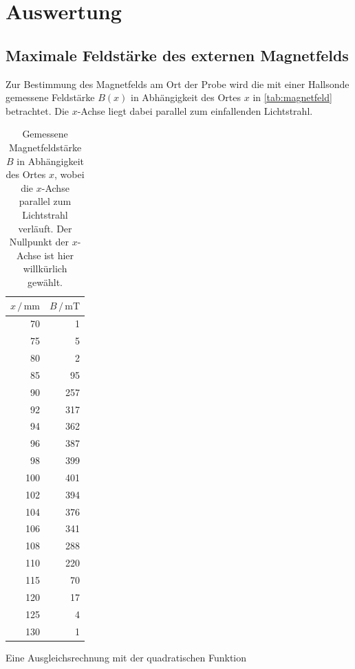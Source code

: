 \section{Auswertung}
\label{sec:Auswertung}

\subsection{Maximale Feldstärke des externen Magnetfelds}
\label{sec:magnetfeld}
Zur Bestimmung des Magnetfelds am Ort der Probe wird die mit einer Hallsonde gemessene Feldstärke $B(x)$ in Abhängigkeit des Ortes $x$ in \autoref{tab:magnetfeld} betrachtet.
Die $x$-Achse liegt dabei parallel zum einfallenden Lichtstrahl.

\begin{table}
    \centering
    \caption{Gemessene Magnetfeldstärke $B$ in Abhängigkeit des Ortes $x$, wobei die $x$-Achse parallel zum Lichtstrahl verläuft.
    Der Nullpunkt der $x$-Achse ist hier willkürlich gewählt.
    }
    \label{tab:magnetfeld}
    \begin{tabular}{r r}
        \toprule
        $x \,/\, \unit{\milli\metre}$ & $B \,/\, \unit{\milli\tesla}$\\
        \midrule
        70 & 1 \\
        75 & 5 \\
        80 & 2 \\
        85 & 95 \\
        90 & 257 \\
        92 & 317 \\
        94 & 362 \\
        96 & 387 \\
        98 & 399 \\
        100 & 401 \\
        102 & 394 \\
        104 & 376 \\
        106 & 341 \\
        108 & 288 \\
        110 & 220 \\
        115 & 70 \\
        120 & 17 \\
        125 & 4 \\
        130 & 1 \\
        \bottomrule
    \end{tabular}
\end{table}
Eine Ausgleichsrechnung mit der quadratischen Funktion
